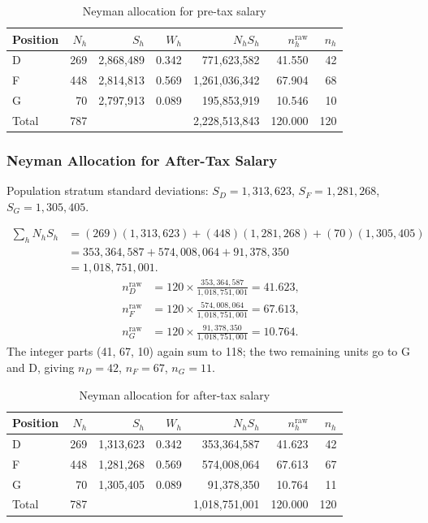 \documentclass[12pt]{article}
\begin{document}
\begin{table}[H]
\centering
\caption{Neyman allocation for pre-tax salary}
\label{tab:neyman_pre}
\begin{tabular}{lrrrrrr}
\toprule
Position & $N_h$ & $S_h$ & $W_h$ & $N_h S_h$ & $n_h^{\text{raw}}$ & $n_h$ \\
\midrule
D & 269 & 2{,}868{,}489 & 0.342 & 771{,}623{,}582   & 41.550 & 42 \\
F & 448 & 2{,}814{,}813 & 0.569 & 1{,}261{,}036{,}342 & 67.904 & 68 \\
G &  70 & 2{,}797{,}913 & 0.089 & 195{,}853{,}919   & 10.546 & 10 \\
\midrule
Total & 787 & & & 2{,}228{,}513{,}843 & 120.000 & 120 \\
\bottomrule
\end{tabular}
\end{table}

\subsubsection*{Neyman Allocation for After-Tax Salary}

Population stratum standard deviations:
$S_D = 1{,}313{,}623$, $S_F = 1{,}281{,}268$, $S_G = 1{,}305{,}405$.

\begin{align*}
  \sum_h N_h S_h
  &= (269)(1{,}313{,}623) + (448)(1{,}281{,}268) + (70)(1{,}305{,}405) \\
  &= 353{,}364{,}587 + 574{,}008{,}064 + 91{,}378{,}350 \\
  &= 1{,}018{,}751{,}001.
\end{align*}
\begin{align*}
  n_D^{\text{raw}} &= 120 \times \frac{353{,}364{,}587}{1{,}018{,}751{,}001} = 41.623, \\[4pt]
  n_F^{\text{raw}} &= 120 \times \frac{574{,}008{,}064}{1{,}018{,}751{,}001} = 67.613, \\[4pt]
  n_G^{\text{raw}} &= 120 \times \frac{91{,}378{,}350}{1{,}018{,}751{,}001} = 10.764.
\end{align*}
The integer parts (41, 67, 10) again sum to 118; the two remaining units go to G and D,
giving $n_D = 42$, $n_F = 67$, $n_G = 11$.

\begin{table}[H]
\centering
\caption{Neyman allocation for after-tax salary}
\label{tab:neyman_after}
\begin{tabular}{lrrrrrr}
\toprule
Position & $N_h$ & $S_h$ & $W_h$ & $N_h S_h$ & $n_h^{\text{raw}}$ & $n_h$ \\
\midrule
D & 269 & 1{,}313{,}623 & 0.342 & 353{,}364{,}587   & 41.623 & 42 \\
F & 448 & 1{,}281{,}268 & 0.569 & 574{,}008{,}064   & 67.613 & 67 \\
G &  70 & 1{,}305{,}405 & 0.089 &  91{,}378{,}350   & 10.764 & 11 \\
\midrule
Total & 787 & & & 1{,}018{,}751{,}001 & 120.000 & 120 \\
\bottomrule
\end{tabular}
\end{table}
\end{document}
